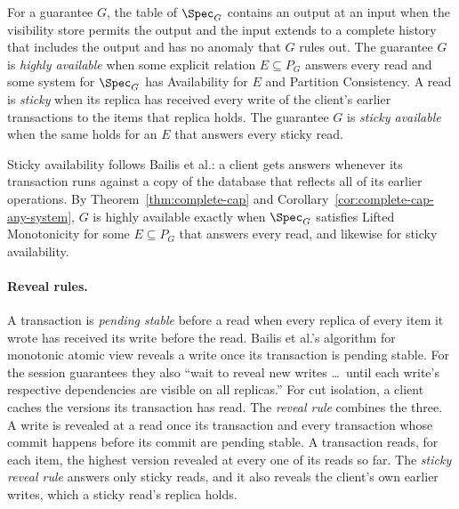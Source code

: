 \begin{definition}
\label{def:hat-availability}
For a guarantee $G$, the table of $\Spec_G$ contains an output at an input when
the visibility store permits the output and the input extends to a complete
history that includes the output and has no anomaly that $G$ rules out.  The
guarantee $G$ is \emph{highly available} when some explicit relation
$E\subseteq P_G$ answers every read and some system for $\Spec_G$ has
Availability for $E$ and Partition Consistency.  A read is \emph{sticky} when
its replica has received every write of the client's earlier transactions to
the items that replica holds.  The guarantee $G$ is \emph{sticky available}
when the same holds for an $E$ that answers every sticky read.
\end{definition}

Sticky availability follows Bailis et al.: a client gets answers whenever its
transaction runs against a copy of the database that reflects all of its
earlier operations.  By Theorem~\ref{thm:complete-cap} and
Corollary~\ref{cor:complete-cap-any-system}, $G$ is highly available exactly
when $\Spec_G$ satisfies Lifted Monotonicity for some $E\subseteq P_G$ that
answers every read, and likewise for sticky availability.

\paragraph{Reveal rules.}
A transaction is \emph{pending stable} before a read when every replica of
every item it wrote has received its write before the read.  Bailis et al.'s
algorithm for monotonic atomic view reveals a write once its transaction is
pending stable.  For the session guarantees they also ``wait to reveal new
writes \ldots\ until each write's respective dependencies are visible on all
replicas.''  For cut isolation, a client caches the versions its transaction
has read.  The \emph{reveal rule} combines the three.  A write is revealed at
a read once its transaction and every transaction whose commit happens before
its commit are pending stable.  A transaction reads, for each item, the
highest version revealed at every one of its reads so far.  The \emph{sticky
reveal rule} answers only sticky reads, and it also reveals the client's own
earlier writes, which a sticky read's replica holds.

